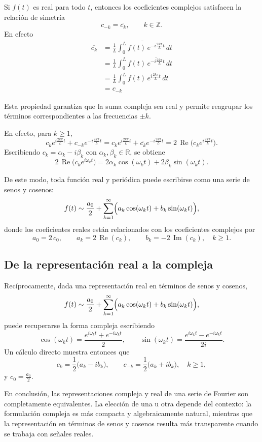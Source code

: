 \documentclass[12pt, a4paper]{amsbook}
\renewcommand{\Re}{\operatorname{Re}}
\def\Im{\operatorname {\mathrm{Im}}}
\newcommand{\R}{{\mathbb R}}
\newcommand{\Z}{{\mathbb Z}}
\theoremstyle{remark}
\theoremstyle{definition}
\numberwithin{section}{chapter}
\numberwithin{subsection}{section}
\numberwithin{equation}{section}
\numberwithin{figure}{chapter}
\begin{document}
Si $f(t)$ es real para todo $t$, entonces los coeficientes complejos satisfacen la relación de simetría
$$
c_{-k} = \overline{c_k}, \qquad k\in\Z.
$$
En efecto
\begin{align*}
\overline{c_k} &= \overline{\frac{1}{L}\int_0^L f(t)\,e^{-i\frac{2k\pi}{L} t}\,dt}\\
& = \frac{1}{L}\int_0^L f(t)\,\overline{e^{-i\frac{2k\pi}{L} t}}\,dt\\
& =  \frac{1}{L}\int_0^L f(t)\,e^{i\frac{2k\pi}{L} t}\,dt\\
&= c_{-k}
\end{align*}

Esta propiedad garantiza que la suma compleja sea real y permite reagrupar los términos correspondientes a las frecuencias $\pm k$.

En efecto, para $k\geq 1$,
$$
c_k e^{i\frac{2k\pi}{L} t} + c_{-k} e^{-i\frac{2k\pi}{L} t} = c_k e^{i\frac{2k\pi}{L} t} + \overline{c_k} e^{-i\frac{2k\pi}{L} t} = 2\,\Re\bigl(c_k e^{i\frac{2k\pi}{L} t}\bigr).
$$
Escribiendo $c_k = \alpha_k - i\beta_k$ con $\alpha_k,\beta_k\in\R$, se obtiene
$$
2\,\Re\bigl(c_k e^{i\omega_k t}\bigr) = 2\alpha_k \cos(\omega_k t) + 2\beta_k \sin(\omega_k t).
$$

De este modo, toda función real y periódica puede escribirse como una serie de senos y cosenos:
$$
f(t) \sim \frac{a_0}{2} + \sum_{k=1}^\infty \Bigl( a_k \cos(\omega_k t) + b_k \sin(\omega_k t) \Bigr),
$$
donde los coeficientes reales están relacionados con los coeficientes complejos por
$$
a_0 = 2\, c_0, \qquad a_k = 2\,\Re(c_k), \qquad b_k = -2\,\Im(c_k), \quad k\geq 1.
$$

\subsection{De la representación real a la compleja}\label{real.a.complejo}

Recíprocamente, dada una representación real en términos de senos y cosenos,
$$
f(t) \sim \frac{a_0}{2} + \sum_{k=1}^\infty \Bigl( a_k \cos(\omega_k t) + b_k \sin(\omega_k t) \Bigr),
$$
puede recuperarse la forma compleja escribiendo
$$
\cos(\omega_k t) = \frac{e^{i\omega_k t}+e^{-i\omega_k t}}{2}, \qquad \sin(\omega_k t) = \frac{e^{i\omega_k t}-e^{-i\omega_k t}}{2i}.
$$
Un cálculo directo muestra entonces que
$$
c_k = \frac{1}{2}\bigl(a_k - i b_k\bigr), \qquad c_{-k} = \frac{1}{2}\bigl(a_k + i b_k\bigr), \quad k\geq 1,
$$
y $c_0 = \frac{a_0}{2}$.


En conclusión, las representaciones compleja y real de una serie de Fourier son completamente equivalentes. La elección de una u otra depende del contexto: la formulación compleja es más compacta y algebraicamente natural, mientras que la representación en términos de senos y cosenos resulta más transparente cuando se trabaja con señales reales.
\end{document}
